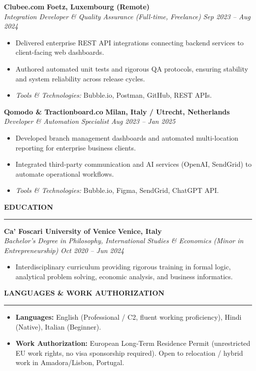\documentclass[10pt,a4paper]{article}
\newcommand{\cvsection}[1]{%
  \vspace{6pt}%
  {\large\bfseries\MakeUppercase{#1}}%
  \vspace{2pt}%
  \hrule%
  \vspace{4pt}%
}
\newcommand{\cvexperience}[4]{%
  \noindent\textbf{#1} \hfill \textbf{#2}\\%
  \noindent\textit{#3} \hfill \textit{#4}%
  \vspace{2pt}%
}
\begin{document}
\vspace{4pt}
\cvexperience{Clubee.com}{Foetz, Luxembourg (Remote)}{Integration Developer \& Quality Assurance (Full-time, Freelance)}{Sep 2023 -- Aug 2024}
\begin{itemize}[leftmargin=*, noitemsep, topsep=2pt, parsep=1pt]
  \item Delivered enterprise REST API integrations connecting backend services to client-facing web dashboards.
  \item Authored automated unit tests and rigorous QA protocols, ensuring stability and system reliability across release cycles.
  \item \textit{Tools \& Technologies:} Bubble.io, Postman, GitHub, REST APIs.
\end{itemize}

\vspace{4pt}
\cvexperience{Qomodo \& Tractionboard.co}{Milan, Italy / Utrecht, Netherlands}{Developer \& Automation Specialist}{Aug 2023 -- Jan 2025}
\begin{itemize}[leftmargin=*, noitemsep, topsep=2pt, parsep=1pt]
  \item Developed branch management dashboards and automated multi-location reporting for enterprise business clients.
  \item Integrated third-party communication and AI services (OpenAI, SendGrid) to automate operational workflows.
  \item \textit{Tools \& Technologies:} Bubble.io, Figma, SendGrid, ChatGPT API.
\end{itemize}

\cvsection{Education}
\cvexperience{Ca' Foscari University of Venice}{Venice, Italy}{Bachelor's Degree in Philosophy, International Studies \& Economics (Minor in Entrepreneurship)}{Oct 2020 -- Jun 2024}
\begin{itemize}[leftmargin=*, noitemsep, topsep=2pt]
  \item Interdisciplinary curriculum providing rigorous training in formal logic, analytical problem solving, economic analysis, and business informatics.
\end{itemize}

\cvsection{Languages \& Work Authorization}
\begin{itemize}[leftmargin=*, noitemsep, topsep=1pt]
  \item \textbf{Languages:} English (Professional / C2, fluent working proficiency), Hindi (Native), Italian (Beginner).
  \item \textbf{Work Authorization:} European Long-Term Residence Permit (unrestricted EU work rights, no visa sponsorship required). Open to relocation / hybrid work in Amadora/Lisbon, Portugal.
\end{itemize}
\end{document}
